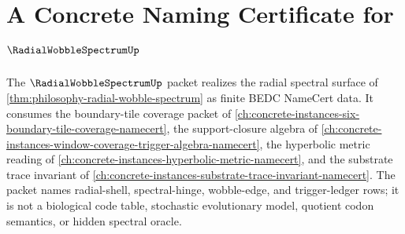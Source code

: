 \chapter{A Concrete Naming Certificate for $\RadialWobbleSpectrumUp$}
\label{ch:concrete-instances-radial-wobble-spectrum-namecert}

The $\RadialWobbleSpectrumUp$ packet realizes the radial spectral surface of \autoref{thm:philosophy-radial-wobble-spectrum} as finite BEDC NameCert data. It consumes the boundary-tile coverage packet of \autoref{ch:concrete-instances-six-boundary-tile-coverage-namecert}, the support-closure algebra of \autoref{ch:concrete-instances-window-coverage-trigger-algebra-namecert}, the hyperbolic metric reading of \autoref{ch:concrete-instances-hyperbolic-metric-namecert}, and the substrate trace invariant of \autoref{ch:concrete-instances-substrate-trace-invariant-namecert}. The packet names radial-shell, spectral-hinge, wobble-edge, and trigger-ledger rows; it is not a biological code table, stochastic evolutionary model, quotient codon semantics, or hidden spectral oracle.

